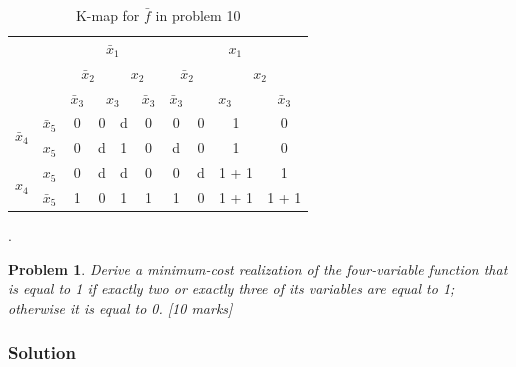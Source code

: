 \documentclass[twocolumn]{article}
\newtheorem{prob}{Problem}
\newcommand{\bx}{\bar{x}}
\newcommand{\cred}{\color{red}}
\newcommand{\cg}{\color{green}}
\newcommand{\cb}{\color{blue}}
\begin{document}
\begin{table}
  \centering
  \begin{tabular}{c|c|c|c|c|c|c|c|c|c}
  \toprule
  && \multicolumn{4}{c|}{$\bx_1$} & \multicolumn{4}{c}{$x_1$}
    \\
    && \multicolumn{2}{c|}{$\bx_2$} & \multicolumn{2}{c|}{$x_2$}
               & \multicolumn{2}{c|}{$\bx_2$} & \multicolumn{2}{c}{$x_2$}
  \\
  && $\bx_3$ & \multicolumn{2}{c|}{$x_3$} & $\bx_3$
              & $\bx_3$ & \multicolumn{2}{c|}{$x_3$} & $\bx_3$
  \\ \midrule
  \multirow{2}{*}{$\bx_4$} & $\bx_5$
                                  & 0 & 0 & \cred d & 0
                                              & 0 & 0 &  \cred 1 & 0
  \\
  & $x_5$
                                  & 0 & d  & \cred 1 & 0
                                              & d & 0 &  \cred 1 & 0
  \\
  \multirow{2}{*}{$x_4$}   &  $x_5$
                                  & 0 & d & \cred d & 0
                                              & 0 & d  &  \cred 1 + \cb 1 & \cb 1
  \\
  & $\bx_5$
                                  & \cg 1 & 0 & \cred 1 & \cg 1
                                              & \cg 1 & 0 &  \cred 1 + \cb 1 & \cg 1 + \cb 1
  \\\bottomrule
\end{tabular}.
\caption{K-map for $\bar{f}$ in problem 10}
\label{tab:prob10inv}
\end{table}


\begin{prob}
Derive a minimum-cost realization of the four-variable function that is equal to 1 if exactly
two or exactly three of its variables are equal to 1; otherwise it is equal to
0. \cite[Prob 2.46]{brown2013fundamentals} [10 marks]
\end{prob}

\subsubsection*{Solution}
\end{document}
